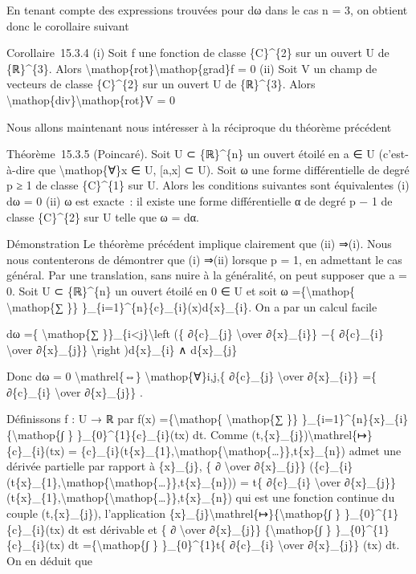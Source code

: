 \documentclass[]{article}
\begin{document}
En tenant compte des expressions trouvées pour dω dans le cas n = 3, on
obtient donc le corollaire suivant

Corollaire~15.3.4 (i) Soit f une fonction de classe \{C\}\^{}\{2\} sur
un ouvert U de \{ℝ\}\^{}\{3\}. Alors
\textbackslash{}mathop\{rot\}\textbackslash{}mathop\{grad\}f = 0 (ii)
Soit V un champ de vecteurs de classe \{C\}\^{}\{2\} sur un ouvert U de
\{ℝ\}\^{}\{3\}. Alors
\textbackslash{}mathop\{div\}\textbackslash{}mathop\{rot\}V = 0

Nous allons maintenant nous intéresser à la réciproque du théorème
précédent

Théorème~15.3.5 (Poincaré). Soit U ⊂ \{ℝ\}\^{}\{n\} un ouvert étoilé en
a ∈ U (c'est-à-dire que \textbackslash{}mathop\{∀\}x ∈ U, {[}a,x{]} ⊂
U). Soit ω une forme différentielle de degré p ≥ 1 de classe
\{C\}\^{}\{1\} sur U. Alors les conditions suivantes sont équivalentes
(i) dω = 0 (ii) ω est exacte~: il existe une forme différentielle α de
degré p − 1 de classe \{C\}\^{}\{2\} sur U telle que ω = dα.

Démonstration Le théorème précédent implique clairement que (ii) ⇒(i).
Nous nous contenterons de démontrer que (i) ⇒(ii) lorsque p = 1, en
admettant le cas général. Par une translation, sans nuire à la
généralité, on peut supposer que a = 0. Soit U ⊂ \{ℝ\}\^{}\{n\} un
ouvert étoilé en 0 ∈ U et soit ω =\{\textbackslash{}mathop\{
\textbackslash{}mathop\{∑ \}\}
\}\_\{i=1\}\^{}\{n\}\{c\}\_\{i\}(x)d\{x\}\_\{i\}. On a par un calcul
facile

dω =\{ \textbackslash{}mathop\{∑
\}\}\_\{i\textless{}j\}\textbackslash{}left (\{ ∂\{c\}\_\{j\}
\textbackslash{}over ∂\{x\}\_\{i\}\} −\{ ∂\{c\}\_\{i\}
\textbackslash{}over ∂\{x\}\_\{j\}\} \textbackslash{}right
)d\{x\}\_\{i\} ∧ d\{x\}\_\{j\}

Donc dω = 0 \textbackslash{}mathrel\{⇔\}
\textbackslash{}mathop\{∀\}i,j,\{ ∂\{c\}\_\{j\} \textbackslash{}over
∂\{x\}\_\{i\}\} =\{ ∂\{c\}\_\{i\} \textbackslash{}over ∂\{x\}\_\{j\}\} .

Définissons f : U → ℝ par f(x) =\{\textbackslash{}mathop\{
\textbackslash{}mathop\{∑ \}\}
\}\_\{i=1\}\^{}\{n\}\{x\}\_\{i\}\{\textbackslash{}mathop\{∫ \}
\}\_\{0\}\^{}\{1\}\{c\}\_\{i\}(tx) dt. Comme
(t,\{x\}\_\{j\})\textbackslash{}mathrel\{↦\}\{c\}\_\{i\}(tx) =
\{c\}\_\{i\}(t\{x\}\_\{1\},\textbackslash{}mathop\{\textbackslash{}mathop\{\ldots{}\}\},t\{x\}\_\{n\})
admet une dérivée partielle par rapport à \{x\}\_\{j\}, \{ ∂
\textbackslash{}over ∂\{x\}\_\{j\}\}
(\{c\}\_\{i\}(t\{x\}\_\{1\},\textbackslash{}mathop\{\textbackslash{}mathop\{\ldots{}\}\},t\{x\}\_\{n\}))
= t\{ ∂\{c\}\_\{i\} \textbackslash{}over ∂\{x\}\_\{j\}\}
(t\{x\}\_\{1\},\textbackslash{}mathop\{\textbackslash{}mathop\{\ldots{}\}\},t\{x\}\_\{n\})
qui est une fonction continue du couple (t,\{x\}\_\{j\}), l'application
\{x\}\_\{j\}\textbackslash{}mathrel\{↦\}\{\textbackslash{}mathop\{∫ \}
\}\_\{0\}\^{}\{1\}\{c\}\_\{i\}(tx) dt est dérivable et \{ ∂
\textbackslash{}over ∂\{x\}\_\{j\}\} \{\textbackslash{}mathop\{∫ \}
\}\_\{0\}\^{}\{1\}\{c\}\_\{i\}(tx) dt =\{\textbackslash{}mathop\{∫ \}
\}\_\{0\}\^{}\{1\}t\{ ∂\{c\}\_\{i\} \textbackslash{}over ∂\{x\}\_\{j\}\}
(tx) dt. On en déduit que
\end{document}
